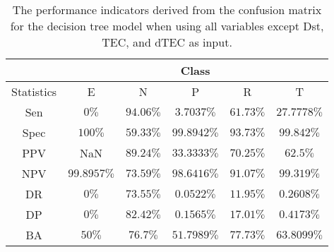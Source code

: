 \begin{table}[!ht]
	\centering
	\begin{tabular}{|c|c|c|c|c|c|}
		\hline
		 & \multicolumn{5}{c|}{Class} \\ \hline
		Statistics & E & N & P & R & T \\ \hline
		Sen & $0\%$ & $94.06\%$ & $3.7037\%$ & $61.73\%$ & $27.7778\%$ \\ \hline
		Spec & $100\%$ & $59.33\%$ & $99.8942\%$ & $93.73\%$ & $99.842\%$ \\ \hline
		PPV & NaN & $89.24\%$ & $33.3333\%$ & $70.25\%$ & $62.5\%$ \\ \hline
		NPV & $99.8957\%$ & $73.59\%$ & $98.6416\%$ & $91.07\%$ & $99.319\%$ \\ \hline
		DR & $0\%$ & $73.55\%$ & $0.0522\%$ & $11.95\%$ & $0.2608\%$ \\ \hline
		DP & $0\%$ & $82.42\%$ & $0.1565\%$ & $17.01\%$ & $0.4173\%$ \\ \hline
		BA & $50\%$ & $76.7\%$ & $51.7989\%$ & $77.73\%$ & $63.8099\%$ \\ \hline
	\end{tabular}
	\caption{The performance indicators derived from the confusion matrix for the decision tree model when using all variables except Dst, TEC, and dTEC as input.}
	\label{tab:cs:reverse:noTEC:C5.0}
\end{table}
